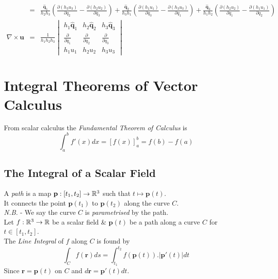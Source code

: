 \documentclass[11pt,a4paper]{article}
\begin{document}
\[\begin{array}{rcll}
&=&\frac{\hat{\textbf{q}}_1}{h_2h_3}\left(\frac{\partial(h_3u_3)}{\partial q_2}-\frac{\partial(h_2u_2)}{\partial q_3}\right)
+\frac{\hat{\textbf{q}}_2}{h_3h_1}\left(\frac{\partial(h_1u_1)}{\partial q_3}-\frac{\partial(h_3u_3)}{\partial q_1}\right)
+\frac{\hat{\textbf{q}}_3}{h_1h_2}\left(\frac{\partial(h_2u_2)}{\partial q_1}-\frac{\partial(h_1u_1)}{\partial q_2}\right)\\
\nabla\times\textbf{u}&=&\frac{1}{h_1h_2h_3}\begin{vmatrix}
h_1\hat{\textbf{q}}_1 & h_2\hat{\textbf{q}}_2 & h_3\hat{\textbf{q}}_3\\
\frac{\partial}{\partial q_1} & \frac{\partial}{\partial q_2} & \frac{\partial}{\partial q_3}\\
h_1u_1 & h_2u_2 & h_3u_3
\end{vmatrix}
\end{array}\]

\section{Integral Theorems of Vector Calculus}

From scalar calculus the \textit{Fundamental Theorem of Calculus} is
$$\int_a^bf'(x)dx=[f(x)]_a^b=f(b)-f(a)$$

\subsection{The Integral of a Scalar Field}

A \textit{path} is a map $\textbf{p}:[t_1,t_2]\to\mathbb{R}^3$ such that $t\mapsto\textbf{p}(t)$.\\
It connects the point $\textbf{p}(t_1)$ to $\textbf{p}(t_2)$ along the curve $C$.\\
\textit{N.B.} - We say the curve $C$ is \textit{parametrised} by the path.\\

Let $f:\mathbb{R}^3\to\mathbb{R}$ be a scalar field \& $\textbf{p}(t)$ be a path along a curve $C$ for $t\in[t_1,t_2]$.\\
The \textit{Line Integral} of $f$ along $C$ is found by
$$\int_Cf(\textbf{r})ds=\int_{t_1}^{t_2}f(\textbf{p}(t)).|\textbf{p}'(t)|dt$$
Since $\textbf{r}=\textbf{p}(t)$ on $C$ and $d\textbf{r}=\textbf{p}'(t)dt$.\\
\end{document}
